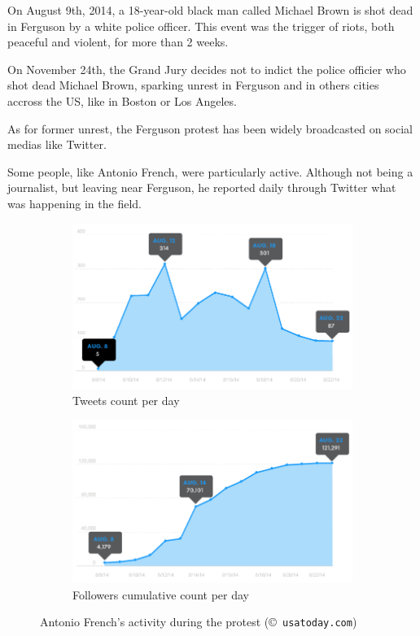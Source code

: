 \documentclass[a4paper,twoside,12pt,openright]{report}
\begin{document}
On August 9th, 2014, a 18-year-old black man called Michael Brown is shot dead in Ferguson by a white police officer. This event was the trigger of riots, both peaceful and violent, for more than 2 weeks.

On November 24th, the Grand Jury decides not to indict the police officier who shot dead Michael Brown, sparking unrest in Ferguson and in others cities accross the US, like in Boston or Los Angeles.



As for former unrest, the Ferguson protest has been widely broadcasted on social medias like Twitter. 

Some people, like Antonio French, were particularly active. Although not being a journalist, but leaving near Ferguson, he reported daily through Twitter what was happening in the field.
\begin{figure}[H]
\begin{subfigure}[t]{0.48\textwidth}
\begin{center}
	\includegraphics[width=\textwidth]{images/freqs/intro/af_tweets.png}
	\caption{Tweets count per day}
\end{center}
\end{subfigure}
\hfill
\begin{subfigure}[t]{0.48\textwidth}
\begin{center}
	\includegraphics[width=\textwidth]{images/freqs/intro/af_followers.png}
	\caption{Followers cumulative count per day}
\end{center}
\end{subfigure}
\caption{Antonio French's activity during the protest (\copyright \texttt{ usatoday.com})}
\label{afactivity}
\end{figure}
\end{document}
